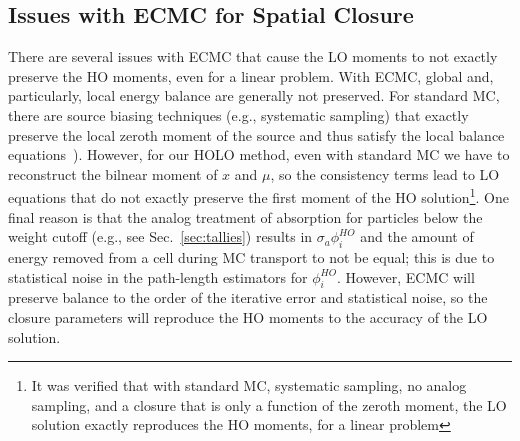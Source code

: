 \subsection{Issues with ECMC for Spatial Closure}
\label{sec:ecmc_issues}
There are several issues with ECMC that cause the LO moments to not exactly preserve
the HO moments, even for a linear problem.  With ECMC, global and, particularly, local
energy balance are generally not preserved.  For standard MC, there
are source biasing techniques (e.g., systematic
sampling) that exactly preserve the local zeroth moment of the
source and thus satisfy the local balance equations~\cite{shultis_mc,wollaber_review}). 
However, for our HOLO method, even with standard MC we have to reconstruct the bilnear moment
of $x$ and $\mu$, so the consistency terms lead to LO equations that do not exactly
preserve the first moment of the HO solution\footnote{It was verified that with
standard MC, systematic sampling, no analog sampling, and a closure that is only a
function of the zeroth moment, the LO solution exactly reproduces the HO moments, for
a linear problem}.  One final reason is that the analog treatment of absorption for
particles below the weight cutoff (e.g., see Sec.~\ref{sec:tallies}) results in
$\sigma_a \phi^{HO}_i$ and the amount of energy removed from a cell during MC
transport to not be equal; this is due to statistical noise in the path-length
estimators for $\phi^{HO}_i$.  However, ECMC will preserve balance to the order of
the iterative error and statistical noise, so the closure parameters will reproduce
the HO moments to the accuracy of the LO solution.  




